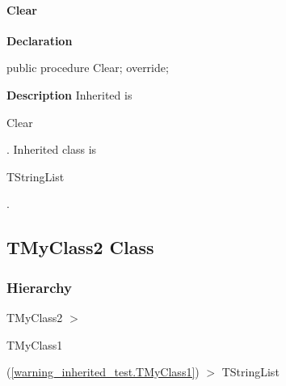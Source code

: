 \documentclass{report}
\newif\ifpdf
\begin{document}
\paragraph*{Clear}\hspace*{\fill}

\label{warning_inherited_test.TMyClass1-Clear}
\begin{list}{}{
\setlength{\itemindent}{0cm}
\setlength{\listparindent}{0cm}
\setlength{\leftmargin}{\evensidemargin}
\addtolength{\leftmargin}{\tmplength}
\settowidth{\labelsep}{X}
\addtolength{\leftmargin}{\labelsep}
\setlength{\labelwidth}{\tmplength}
}
\item[\textbf{Declaration}\hfill]
\ifpdf
\begin{flushleft}
\fi
\begin{ttfamily}
public procedure Clear; override;\end{ttfamily}

\ifpdf
\end{flushleft}
\fi

\par
\item[\textbf{Description}]
Inherited is \begin{ttfamily}Clear\end{ttfamily}. Inherited class is \begin{ttfamily}TStringList\end{ttfamily}.

\end{list}
\ifpdf
\subsection*{\large{\textbf{TMyClass2 Class}}\normalsize\hspace{1ex}\hrulefill}
\else
\subsection*{TMyClass2 Class}
\fi
\label{warning_inherited_test.TMyClass2}
\subsubsection*{\large{\textbf{Hierarchy}}\normalsize\hspace{1ex}\hfill}
TMyClass2 {$>$} \begin{ttfamily}TMyClass1\end{ttfamily}(\ref{warning_inherited_test.TMyClass1}) {$>$} 
TStringList
\end{document}

